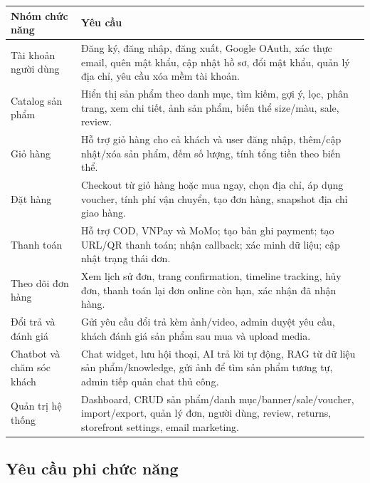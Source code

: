 \documentclass[12pt,a4paper]{report}
\begin{document}
\begin{longtable}{|p{4cm}|p{10.8cm}|}
\hline
\textbf{Nhóm chức năng} & \textbf{Yêu cầu} \\
\hline
Tài khoản người dùng & Đăng ký, đăng nhập, đăng xuất, Google OAuth, xác thực email, quên mật khẩu, cập nhật hồ sơ, đổi mật khẩu, quản lý địa chỉ, yêu cầu xóa mềm tài khoản. \\
\hline
Catalog sản phẩm & Hiển thị sản phẩm theo danh mục, tìm kiếm, gợi ý, lọc, phân trang, xem chi tiết, ảnh sản phẩm, biến thể size/màu, sale, review. \\
\hline
Giỏ hàng & Hỗ trợ giỏ hàng cho cả khách và user đăng nhập, thêm/cập nhật/xóa sản phẩm, đếm số lượng, tính tổng tiền theo biến thể. \\
\hline
Đặt hàng & Checkout từ giỏ hàng hoặc mua ngay, chọn địa chỉ, áp dụng voucher, tính phí vận chuyển, tạo đơn hàng, snapshot địa chỉ giao hàng. \\
\hline
Thanh toán & Hỗ trợ COD, VNPay và MoMo; tạo bản ghi payment; tạo URL/QR thanh toán; nhận callback; xác minh dữ liệu; cập nhật trạng thái đơn. \\
\hline
Theo dõi đơn hàng & Xem lịch sử đơn, trang confirmation, timeline tracking, hủy đơn, thanh toán lại đơn online còn hạn, xác nhận đã nhận hàng. \\
\hline
Đổi trả và đánh giá & Gửi yêu cầu đổi trả kèm ảnh/video, admin duyệt yêu cầu, khách đánh giá sản phẩm sau mua và upload media. \\
\hline
Chatbot và chăm sóc khách & Chat widget, lưu hội thoại, AI trả lời tự động, RAG từ dữ liệu sản phẩm/knowledge, gửi ảnh để tìm sản phẩm tương tự, admin tiếp quản chat thủ công. \\
\hline
Quản trị hệ thống & Dashboard, CRUD sản phẩm/danh mục/banner/sale/voucher, import/export, quản lý đơn, người dùng, review, returns, storefront settings, email marketing. \\
\hline
\end{longtable}

\subsection{Yêu cầu phi chức năng}
\end{document}
